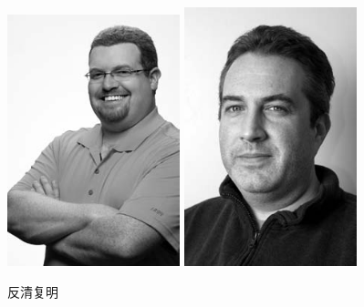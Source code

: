 \documentclass{article}
\begin{document}
\begin{figure}[htbp]
  \centering
  \includegraphics[width=5.0cm]{../pic/Author.png}
  \includegraphics[width=5.0cm]{../pic/KevinMiller.png}
  \caption{反清复明}
\end{figure}
\end{document}
